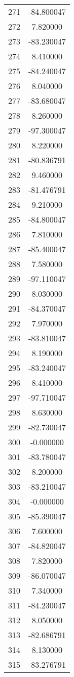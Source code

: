 \documentclass[12pt]{article}
\begin{document}
\begin{longtable}{@{}cc@{}}
271 & -84.800047 \\
272 & 7.820000 \\
273 & -83.230047 \\
274 & 8.410000 \\
275 & -84.240047 \\
276 & 8.040000 \\
277 & -83.680047 \\
278 & 8.260000 \\
279 & -97.300047 \\
280 & 8.220000 \\
281 & -80.836791 \\
282 & 9.460000 \\
283 & -81.476791 \\
284 & 9.210000 \\
285 & -84.800047 \\
286 & 7.810000 \\
287 & -85.400047 \\
288 & 7.580000 \\
289 & -97.110047 \\
290 & 8.030000 \\
291 & -84.370047 \\
292 & 7.970000 \\
293 & -83.810047 \\
294 & 8.190000 \\
295 & -83.240047 \\
296 & 8.410000 \\
297 & -97.710047 \\
298 & 8.630000 \\
299 & -82.730047 \\
300 & -0.000000 \\
301 & -83.780047 \\
302 & 8.200000 \\
303 & -83.210047 \\
304 & -0.000000 \\
305 & -85.390047 \\
306 & 7.600000 \\
307 & -84.820047 \\
308 & 7.820000 \\
309 & -86.070047 \\
310 & 7.340000 \\
311 & -84.230047 \\
312 & 8.050000 \\
313 & -82.686791 \\
314 & 8.130000 \\
315 & -83.276791 \\

\end{longtable}
\end{document}
